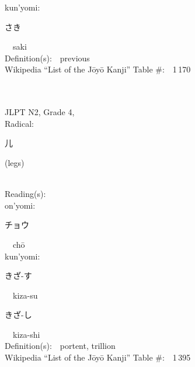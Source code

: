 \begin{multicols}{2}
{\hspace*{1em}}kun'yomi:\ \ \\
{\hspace*{2em}}{\begin{CJK}{UTF8}{min} さき \end{CJK}}\ \ saki\ \ \\
Definition(s):\ \ previous \\
Wikipedia ``List of the J\=oy\=o Kanji'' Table \#:\ \ 1\,170 \\
\ \ \\
{\fontsize{34pt}{40pt}  }\ \ \\  %
{JLPT N2, Grade 4, \\Radical:\ \ {\begin{CJK}{UTF8}{min} 儿 \end{CJK}} (legs) } \\
Reading(s):\ \ \\
{\hspace*{1em}}on'yomi:\ \ \\
{\hspace*{2em}}{\begin{CJK}{UTF8}{min} チョウ \end{CJK}}\ \ ch\=o\ \ \\
{\hspace*{1em}}kun'yomi:\ \ \\
{\hspace*{2em}}{\begin{CJK}{UTF8}{min} きざ-す \end{CJK}}\ \ kiza-su\ \ \\
{\hspace*{2em}}{\begin{CJK}{UTF8}{min} きざ-し \end{CJK}}\ \ kiza-shi\ \ \\
Definition(s):\ \ portent, trillion \\
Wikipedia ``List of the J\=oy\=o Kanji'' Table \#:\ \ 1\,395 \\
\ \ \\
\end{multicols}



%
\newpage


